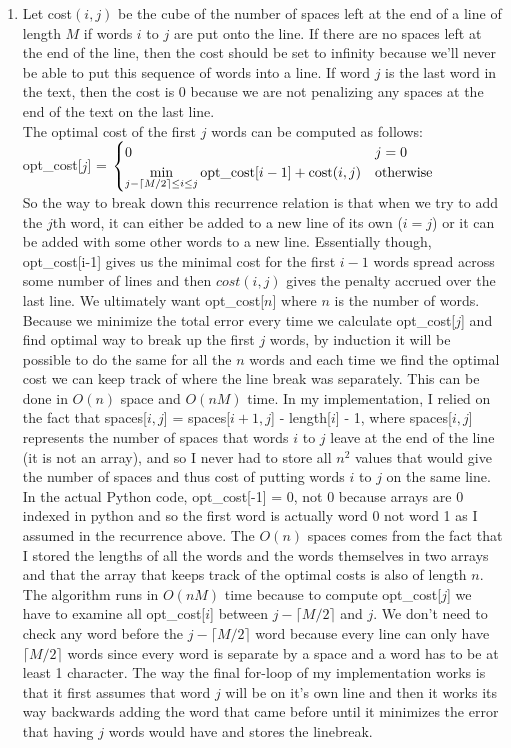 \documentclass{article}
\begin{document}
\begin{enumerate}
	\item Let cost$(i,j)$ be the cube of the number of spaces left at the end of a line of length $M$ if words $i$ to $j$ are put onto the line.  If there are no spaces left at the end of the line, then the cost should be set to infinity because we'll never be able to put this sequence of words into a line.  If word $j$ is the last word in the text, then the cost is 0 because we are not penalizing any spaces at the end of the text on the last line.  \\
	The optimal cost of the first $j$ words can be computed as follows:\\
	opt\_cost[$j$] = 
	$\begin{cases}
	 0 & j = 0 \\
	 \displaystyle\min_{j-\lceil M/2\rceil\leq i \leq j} \textup{opt\_cost}[i-1] + \textup{cost}(i,j) & \textup{otherwise} \\
	\end{cases} $ \\
	So the way to break down this recurrence relation is that when we try to add the $j$th word, it can either be added to a new line of its own ($i = j$) or it can be added with some other words to a new line.  Essentially though, opt\_cost[i-1] gives us the minimal cost for the first $i-1$ words spread across some number of lines and then $cost(i,j)$ gives the penalty accrued over the last line.  We ultimately want opt\_cost[$n$] where $n$ is the number of words.  Because we minimize the total error every time we calculate opt\_cost[$j$] and find optimal way to break up the first $j$ words, by induction it will be possible to do the same for all the $n$ words and each time we find the optimal cost we can keep track of where the line break was separately. This can be done in $O(n)$ space and $O(nM)$ time.  In my implementation, I relied on the fact that spaces[$i,j$] = spaces[$i+1,j$] - length[$i$] - 1, where spaces[$i,j$] represents the number of spaces that words $i$ to $j$ leave at the end of the line (it is not an array), and so I never had to store all $n^2$ values that would give the number of spaces and thus cost of putting words $i$ to $j$ on the same line.  In the actual Python code, opt\_cost[-1] = 0, not 0 because arrays are 0 indexed in python and so the first word is actually word 0 not word 1 as I assumed in the recurrence above.  The $O(n)$ spaces comes from the fact that I stored the lengths of all the words and the words themselves in two arrays and that the array that keeps track of the optimal costs is also of length $n$.  The algorithm runs in $O(nM)$ time because to compute opt\_cost[$j$] we have to examine all opt\_cost[$i$] between $j-\lceil M/2\rceil$ and $j$. We don't need to check any word before the $j - \lceil M/2\rceil$ word because every line can only have $\lceil M/2\rceil$ words since every word is separate by a space and a word has to be at least 1 character.  The way the final for-loop of my implementation works is that it first assumes that word $j$ will be on it's own line and then it works its way backwards adding the word that came before until it minimizes the error that having $j$ words would have and stores the linebreak.  \\\\

\end{enumerate}
\end{document}
